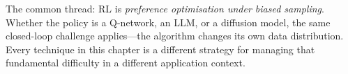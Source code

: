 The common thread: RL is \emph{preference optimisation under biased sampling}.
Whether the policy is a Q-network, an LLM, or a diffusion model, the same closed-loop challenge applies---the algorithm changes its own data distribution.
Every technique in this chapter is a different strategy for managing that fundamental difficulty in a different application context.
